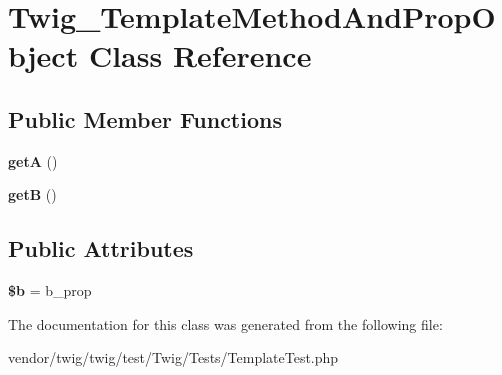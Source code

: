 \hypertarget{classTwig__TemplateMethodAndPropObject}{}\section{Twig\+\_\+\+Template\+Method\+And\+Prop\+Object Class Reference}
\label{classTwig__TemplateMethodAndPropObject}
\subsection*{Public Member Functions}
\begin{DoxyCompactItemize}
\item 
{\bfseries getA} ()\hypertarget{classTwig__TemplateMethodAndPropObject_ae5582b817e1d3edf4dfb2be5c192f48f}{}\label{classTwig__TemplateMethodAndPropObject_ae5582b817e1d3edf4dfb2be5c192f48f}

\item 
{\bfseries getB} ()\hypertarget{classTwig__TemplateMethodAndPropObject_a58254b12afe43110973ee4301efb1b82}{}\label{classTwig__TemplateMethodAndPropObject_a58254b12afe43110973ee4301efb1b82}

\end{DoxyCompactItemize}
\subsection*{Public Attributes}
\begin{DoxyCompactItemize}
\item 
{\bfseries \$b} = \textquotesingle{}b\+\_\+prop\textquotesingle{}\hypertarget{classTwig__TemplateMethodAndPropObject_a7f0dd0bc2146579b1766f270cc733e94}{}\label{classTwig__TemplateMethodAndPropObject_a7f0dd0bc2146579b1766f270cc733e94}

\end{DoxyCompactItemize}


The documentation for this class was generated from the following file\+:\begin{DoxyCompactItemize}
\item 
vendor/twig/twig/test/\+Twig/\+Tests/Template\+Test.\+php\end{DoxyCompactItemize}

